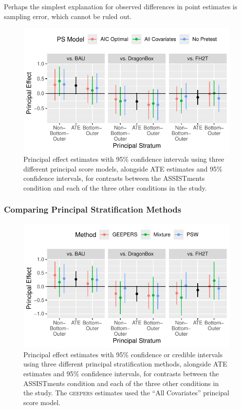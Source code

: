 \documentclass[]{article}
\begin{document}
Perhaps the simplest explanation for observed differences in point estimates is sampling error, which cannot be ruled out.

\begin{figure}
  \centering
  \includegraphics{figure/prinEffs.pdf}
  \caption{Principal effect estimates with 95\% confidence intervals using three different principal score models, alongside ATE estimates and 95\% confidence intervals, for contrasts between the ASSISTments condition and each of the three other conditions in the study.}
  \label{fig:effects}
\end{figure}

\subsubsection{Comparing Principal Stratification Methods}


\begin{figure}
  \centering
  \includegraphics{figure/compareMethods.pdf}
  \caption{Principal effect estimates with 95\% confidence or credible intervals using three different principal stratification methods, alongside ATE estimates and 95\% confidence intervals, for contrasts between the ASSISTments condition and each of the three other conditions in the study. The \textsc{geepers} estimates used the ``All Covariates'' principal score model.}
  \label{fig:compare}
\end{figure}
\end{document}
